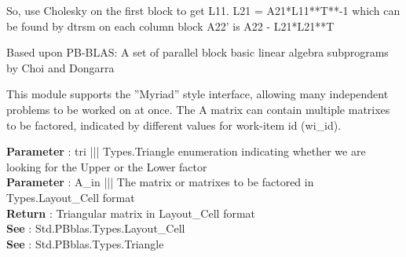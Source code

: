  So, use Cholesky on the first block to get L11. L21 = A21*L11**T**-1 which can be found by dtrsm on each column block A22' is A22 - L21*L21**T 
\par
 Based upon PB-BLAS: A set of parallel block basic linear algebra subprograms by Choi and Dongarra 


\par
 This module supports the ''Myriad'' style interface, allowing many independent problems to be worked on at once. The A matrix can contain multiple matrixes to be factored, indicated by different values for work-item id (wi\_id).


\par
\textbf{Parameter} : tri ||| Types.Triangle enumeration indicating whether we are looking for the Upper or the Lower factor \\
\textbf{Parameter} : A\_in ||| The matrix or matrixes to be factored in Types.Layout\_Cell format \\
\textbf{Return} : Triangular matrix in Layout\_Cell format \\
\textbf{See} : Std.PBblas.Types.Layout\_Cell \\
\textbf{See} : Std.PBblas.Types.Triangle \\
